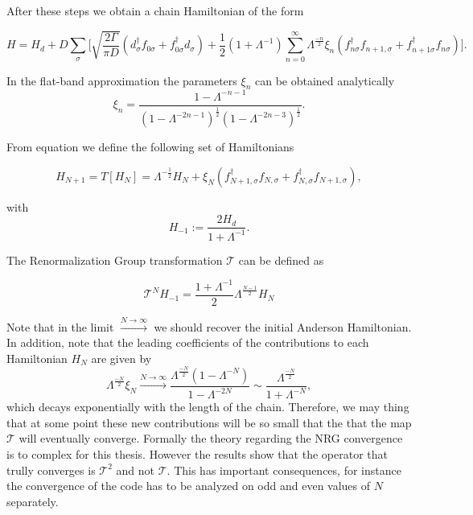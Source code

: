 After these steps we obtain a chain Hamiltonian of the form 

\begin{equation}
H=H_{d}+D\sum_{\sigma}\Biggl[\sqrt{\frac{2\Gamma}{\pi D}}\left(d_{\sigma}^{\dagger}f_{0\sigma}+f_{0\sigma}^{\dagger}d_{\sigma}\right)+\frac{1}{2}\left(1+\Lambda^{-1}\right)\sum_{n=0}^{\infty}\Lambda^{\frac{-n}{2}}\xi_{n}\left(f_{n\sigma}^{\dagger}f_{n+1,\sigma}+f_{n+1\sigma}^{\dagger}f_{n\sigma}\right)\Biggr].\label{eq:chain-Hamiltonian}
\end{equation}


In the flat-band approximation the parameters $\xi_{n}$ can be obtained analytically \citep{bulla_numerical_2008}
\[
\xi_{n}=\frac{1-\Lambda^{-n-1}}{\left(1-\Lambda^{-2n-1}\right)^{\frac{1}{2}}\left(1-\Lambda^{-2n-3}\right)^{\frac{1}{2}}}.
\]


From equation   we define the following set of Hamiltonians

\begin{equation}
H_{N+1}=T\left[H_{N}\right]=\Lambda^{-\frac{1}{2}}H_{N}+\xi_{N}\left(f_{N+1,\sigma}^{\dagger}f_{N,\sigma}+f_{N,\sigma}^{\dagger}f_{N+1,\sigma}\right), \label{eq:NRG-Renormalization}
\end{equation}

with 
\begin{equation}
H_{-1} := \frac{2 H_d}{1+\Lambda^{-1}}.
\end{equation}

The Renormalization Group transformation $\mathcal{T}$ can be defined as 

$$\mathcal{T}^N H_{-1} =  \frac{1+\Lambda^{-1}}{2}\Lambda^\frac{ N-1 }{2} H_N$$

Note that in the limit $\xrightarrow{N\rightarrow\infty}$ we should recover the initial Anderson Hamiltonian. In addition, note that the leading coefficients of the contributions to each Hamiltonian $H_N$ are given by 
\[
\Lambda^{\frac{-N}{2}}\xi_{N}\xrightarrow{N\rightarrow\infty}\frac{\Lambda^{\frac{-N}{2}}\left(1-\Lambda^{-N}\right)}{1-\Lambda^{-2N}}\sim\frac{\Lambda^{\frac{-N}{2}}}{1+\Lambda^{-N}},
\]
\noindent which decays exponentially with the length of the chain. Therefore, we may thing that at some point these new contributions will be so small that the that the map $\mathcal{T}$ will eventually converge. Formally the theory regarding the NRG convergence is to complex for this thesis. However the results show that the operator that trully converges is $\mathcal{T}^2$ and not $\mathcal{T}$\cite{krishna-murthy_renormalization-group_1980}. This has important consequences, for instance the convergence of the code has to be analyzed on odd and even values of $N$ separately. 

